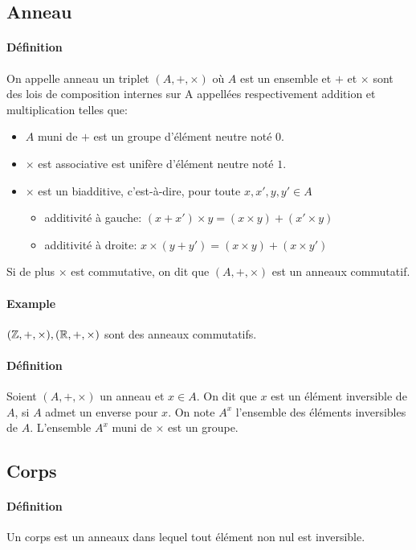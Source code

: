%
\subsection{Anneau}
%
\paragraph{Définition} On appelle anneau un triplet $(A, +, \times)$ où $A$ est un ensemble et $+$ et $\times$ sont des lois de composition internes sur A appellées respectivement addition et multiplication telles que:
\begin{itemize}
  \item $A$ muni de $+$ est un groupe d'élément neutre noté $0$.
  \item $\times$ est associative est unifère d'élément neutre noté $1$.
  \item $\times$ est un biadditive, c'est-à-dire, pour toute $x, x', y, y' \in A$
    \begin{itemize}
      \item additivité à gauche: $(x + x') \times y = (x \times y)+(x' \times y)$
      \item additivité à droite: $x \times (y + y') = (x \times y)+(x \times y')$
    \end{itemize}
\end{itemize}
Si de plus $\times$ est commutative, on dit que $(A, +, \times)$ est un anneaux commutatif.

\paragraph{Example}  $(\mathbb{Z}, +, \times), (\mathbb{R}, +, \times)$ sont des anneaux commutatifs.

\paragraph{Définition} Soient $(A, +, \times)$ un anneau et $x \in A$. On dit que $x$ est un élément inversible de $A$, si $A$ admet un enverse pour $x$. On note $A^{x}$ l'ensemble des éléments inversibles de $A$. L'ensemble $A^{x}$ muni de $\times$ est un groupe.

%
\subsection{Corps}
%
\paragraph{Définition} Un corps est un anneaux dans lequel tout élément non nul est inversible.

